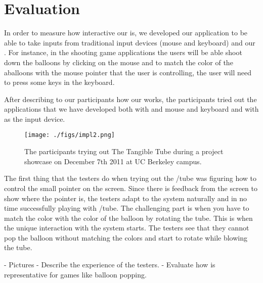 \section{Evaluation}\label{sec:eval}
In order to measure how interactive our \tube is, we developed our application to be able to take inputs from traditional input devices (\ie mouse and keyboard) and our \tube. For instance, in the shooting game applications the users will be able shoot down the balloons by clicking on the mouse and to match the color of the aballoons with the mouse pointer that the user is controlling, the user will need to press some keys in the keyboard.

After describing to our participants how our \tube works, the participants tried out the applications that we have developed both with and mouse and keyboard and with \tube as the input device.

\begin{figure}
  \centering
  \texttt{[image: ./figs/impl2.png]}
  \caption{The participants trying out The Tangible Tube during a project showcase on December 7th 2011 at UC Berkeley campus.}
  \label{fig:impl2}
\end{figure}

The first thing that the testers do when trying out the /tube was figuring how to control the small pointer on the screen. Since there is feedback from the screen to show where the pointer is, the testers adapt to the system naturally and in no time successfully playing with /tube. The challenging part is when you have to match the color with the color of the balloon by rotating the tube. This is when the unique interaction with the system starts. The testers see that they cannot pop the balloon without matching the colors and start to rotate while blowing the tube. 

\TODO
- Pictures \newline
- Describe the experience of the testers. \newline
- Evaluate how \tube is representative for games like balloon popping.
